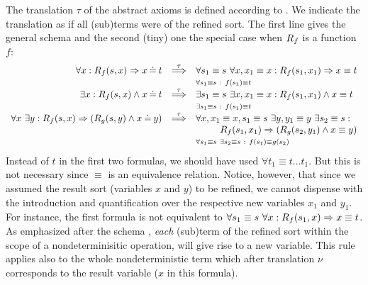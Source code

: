 The translation $\tau$ of the abstract axioms is defined according to . We indicate the translation as if all (sub)terms were of the refined sort. The first line gives the general schema and the second (tiny) one the special case when $R_{f}$ is a function $f$: \begin{equation}\label{eq:relstau}
\begin{array}{rcl}
\forall x: \Pre Rf(s,x)\impl x\Eq t & \TTo{\tau} & \forall s_1\equiv s\ \forall x,x_1\equiv x : \Pre Rf(s_1,x_1)\impl x\equiv t \\
& & {\scriptstyle \forall s_1\equiv s\ :\ f(s_1)\equiv t }\\ 
\exists x: \Pre Rf(s,x)\land x\Eq t & \TTo{\tau} & \exists s_1\equiv s\ \exists x,x_1\equiv x:\Pre Rf(s_1,x_1)\land x\equiv t \\ & & {\scriptstyle \exists s_1\equiv s\ :\ f(s_1)\equiv t} \\ 
\forall x\ \exists y :\Pre Rf(s,x)\impl (\Pre Rg(s,y)\land x\Eq y) & \TTo{\tau} &
\forall x,x_1\equiv x,s_1\equiv s\ \exists y,y_1\equiv y\ \exists s_2\equiv s :
\\
\multicolumn{3}{r}{ \Pre Rf(s_1,x_1)\impl (\Pre Rg(s_2,y_1)\land x\equiv y) }\\
& & {\scriptstyle \forall s_1\equiv s\ \exists s_2\equiv s\ :\ f(s_1)\equiv g(s_2)} \\
\end{array}
\end{equation}
Instead of $t$ in the first two formulas, we should have used $\forall t_1\equiv t ... t_1$. But this is not necessary since $\equiv$ is an equivalence relation. Notice, however, that since we assumed the result sort (variables $x$ and $y$) to be refined, we cannot dispense with the introduction and quantification over the respective new variables $x_1$ and $y_1$.
For instance, the first formula is not equivalent to $\forall s_1\equiv s\ \forall x : R_{f}(s_1,x)\mathrel\Rightarrow x\equiv t$. As emphasized after the schema , {\em each} (sub)term of the refined sort
within the scope of a nondeterminisitic operation, will give rise to a new variable. This rule applies also to the whole nondeterministic term which after translation $\nu$ corresponds to the result variable ($x$ in this formula).


